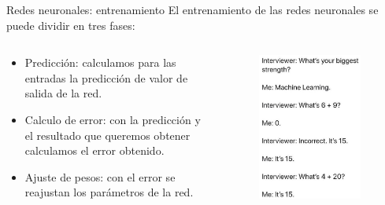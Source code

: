 \begin{frame}{Redes neuronales: entrenamiento}
El entrenamiento de las redes neuronales se puede dividir en tres fases: 
\begin{columns}[c]
\begin{column}{0.49\textwidth}
\begin{itemize}
    \item \alert{Predicción:} calculamos para las entradas la predicción de valor de salida de la red.
    \item \alert{Calculo de error:} con la predicción y el resultado que queremos obtener calculamos el error obtenido.
    \item \alert{Ajuste de pesos:} con el error se reajustan los parámetros de la red.
\end{itemize} 
\end{column}

\begin{column}{0.49\textwidth}
\begin{figure}
\centering
    \includegraphics[width=0.9\textwidth]{figures/Tema 3/jokeML.png}
\end{figure}
\end{column}
\end{columns}
\end{frame}

